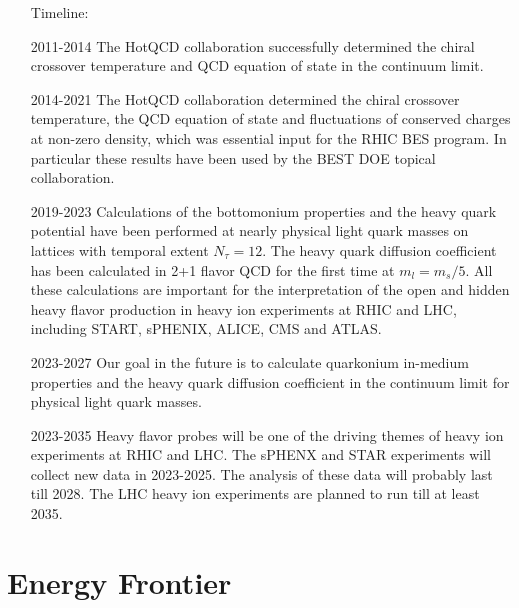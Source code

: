 \documentclass{article}
\begin{document}
\begin{itemize}
  \item[Timeline:]
   \item[2011-2014] The HotQCD collaboration successfully determined
     the chiral crossover temperature and QCD equation of state in the
     continuum limit. 
   \item[2014-2021] The HotQCD collaboration determined the chiral
     crossover temperature, the QCD equation of state and fluctuations
     of conserved charges at non-zero density, which was essential
     input for the RHIC BES program. In particular these results have
     been used by the BEST DOE topical collaboration.
   \item[2019-2023] Calculations of the bottomonium properties and the
     heavy quark potential have been performed at nearly physical
     light quark masses on lattices with temporal extent
     $N_{\tau}=12$. The heavy quark diffusion coefficient has been
     calculated in 2+1 flavor QCD for the first time at
     $m_l=m_s/5$. All these calculations are important for the
     interpretation of the open and hidden heavy flavor production in
     heavy ion experiments at RHIC and LHC, including START, sPHENIX,
     ALICE, CMS and ATLAS.
   \item[2023-2027] Our goal in the future is to calculate quarkonium
     in-medium properties and the heavy quark diffusion coefficient in
     the continuum limit for physical light quark masses.
   \item[2023-2035] Heavy flavor probes will be one of the driving
     themes of heavy ion experiments at RHIC and LHC. The sPHENX and
     STAR experiments will collect new data in 2023-2025. The analysis
     of these data will probably last till 2028. The LHC heavy ion
     experiments are planned to run till at least 2035. 
\end{itemize}


\section{Energy Frontier}\label{sec:energy}






\end{document}
